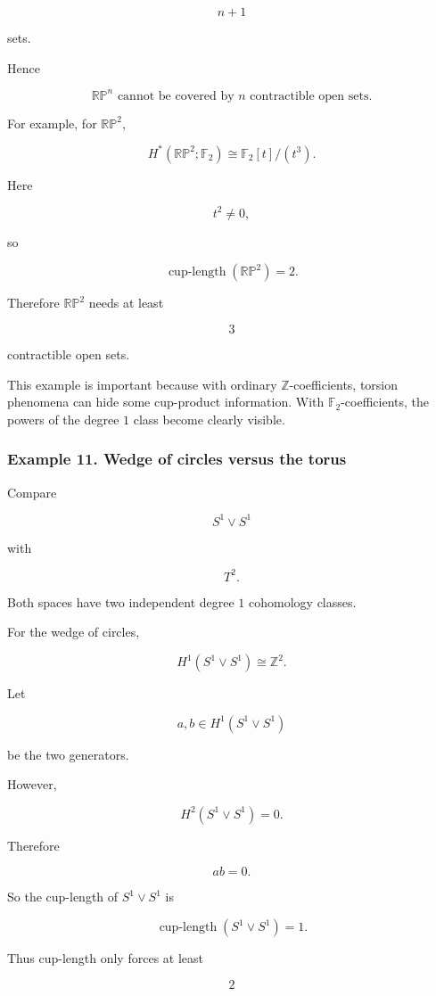 \documentclass[12pt,a4paper]{article}
\theoremstyle{notespace}
\begin{document}
\[
n+1
\]

sets.

Hence

\[
\boxed{
	\mathbb{RP}^n\text{ cannot be covered by }n\text{ contractible open sets.}
}
\]

For example, for \(\mathbb{RP}^2\),

\[
H^*(\mathbb{RP}^2;\mathbb F_2)
\cong
\mathbb F_2[t]/(t^3).
\]

Here

\[
t^2\neq 0,
\]

so

\[
\operatorname{cup\text{-}length}(\mathbb{RP}^2)=2.
\]

Therefore \(\mathbb{RP}^2\) needs at least

\[
3
\]

contractible open sets.

This example is important because with ordinary \(\mathbb Z\)-coefficients, torsion phenomena can hide some cup-product information. With \(\mathbb F_2\)-coefficients, the powers of the degree \(1\) class become clearly visible.

\subsubsection{Example 11. Wedge of circles versus the torus}

Compare

\[
S^1\vee S^1
\]

with

\[
T^2.
\]

Both spaces have two independent degree \(1\) cohomology classes.

For the wedge of circles,

\[
H^1(S^1\vee S^1)
\cong
\mathbb Z^2.
\]

Let

\[
a,b\in H^1(S^1\vee S^1)
\]

be the two generators.

However,

\[
H^2(S^1\vee S^1)=0.
\]

Therefore

\[
ab=0.
\]

So the cup-length of \(S^1\vee S^1\) is

\[
\operatorname{cup\text{-}length}(S^1\vee S^1)=1.
\]

Thus cup-length only forces at least

\[
2
\]
\end{document}
